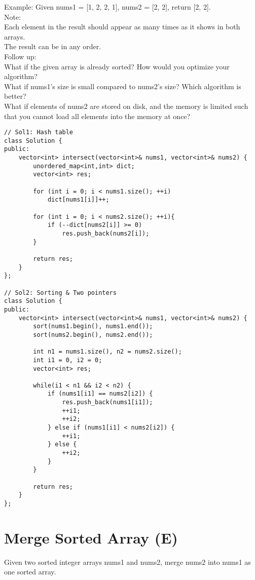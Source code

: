 Example:
Given nums1 = [1, 2, 2, 1], nums2 = [2, 2], return [2, 2].\\

Note:\\
    Each element in the result should appear as many times as it shows in both arrays.\\
    The result can be in any order.\\

Follow up:\\
    What if the given array is already sorted? How would you optimize your algorithm?\\
    What if nums1's size is small compared to nums2's size? Which algorithm is better?\\
    What if elements of nums2 are stored on disk, and the memory is limited such that you cannot load all elements into the memory at once?\\

\begin{lstlisting}
// Sol1: Hash table
class Solution {
public:
    vector<int> intersect(vector<int>& nums1, vector<int>& nums2) {
        unordered_map<int,int> dict;
        vector<int> res;
        
        for (int i = 0; i < nums1.size(); ++i)
            dict[nums1[i]]++;
            
        for (int i = 0; i < nums2.size(); ++i){
            if (--dict[nums2[i]] >= 0)
                res.push_back(nums2[i]);
        }
        
        return res;
    }
};

// Sol2: Sorting & Two pointers
class Solution {
public:
    vector<int> intersect(vector<int>& nums1, vector<int>& nums2) {
        sort(nums1.begin(), nums1.end());
        sort(nums2.begin(), nums2.end());
        
        int n1 = nums1.size(), n2 = nums2.size();
        int i1 = 0, i2 = 0;
        vector<int> res;
        
        while(i1 < n1 && i2 < n2) {
            if (nums1[i1] == nums2[i2]) {
                res.push_back(nums1[i1]);
                ++i1;
                ++i2;
            } else if (nums1[i1] < nums2[i2]) {
                ++i1;
            } else {
                ++i2;
            }
        }
        
        return res;
    }
};
\end{lstlisting}  


\section{Merge Sorted Array (E)}
Given two sorted integer arrays nums1 and nums2, merge nums2 into nums1 as one sorted array.\\

